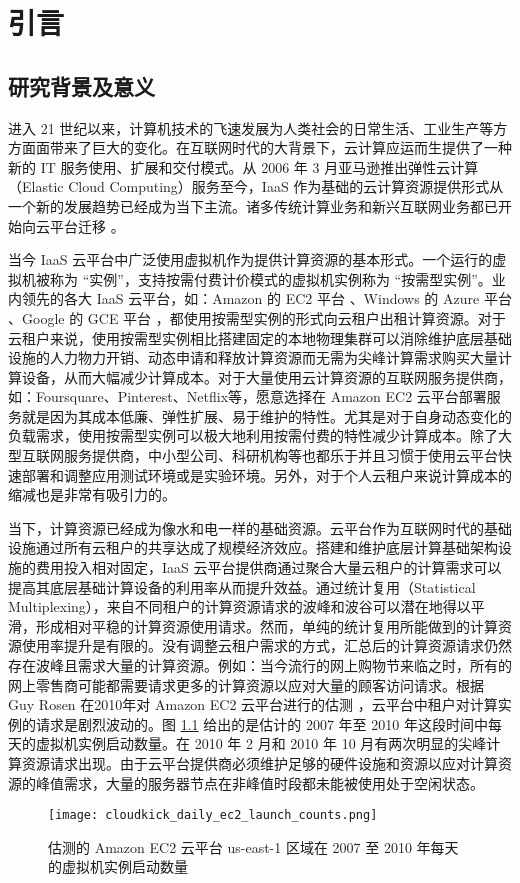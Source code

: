 \chapter{引言}
\label{cha:intro}

\section{研究背景及意义}
进入 21 世纪以来，计算机技术的飞速发展为人类社会的日常生活、工业生产等方方面面带来了巨大的变化。在互联网时代的大背景下，云计算应运而生提供了一种新的 IT 服务使用、扩展和交付模式。从 2006 年 3 月亚马逊推出弹性云计算（Elastic Cloud Computing）服务至今，IaaS 作为基础的云计算资源提供形式从一个新的发展趋势已经成为当下主流。诸多传统计算业务和新兴互联网业务都已开始向云平台迁移 \cite{Armbrust:2010:VCC:1721654.1721672}。

当今 IaaS 云平台中广泛使用虚拟机作为提供计算资源的基本形式。一个运行的虚拟机被称为 ``实例''，支持按需付费计价模式的虚拟机实例称为 ``按需型实例''。业内领先的各大 IaaS 云平台，如：Amazon 的 EC2 平台 \cite{AWS}、Windows 的 Azure 平台 \cite{Azure}、Google 的 GCE 平台 \cite{GCE}，都使用按需型实例的形式向云租户出租计算资源。对于云租户来说，使用按需型实例相比搭建固定的本地物理集群可以消除维护底层基础设施的人力物力开销、动态申请和释放计算资源而无需为尖峰计算需求购买大量计算设备，从而大幅减少计算成本。对于大量使用云计算资源的互联网服务提供商，如：Foursquare、Pinterest、Netflix等，愿意选择在 Amazon EC2 云平台部署服务就是因为其成本低廉、弹性扩展、易于维护的特性。尤其是对于自身动态变化的负载需求，使用按需型实例可以极大地利用按需付费的特性减少计算成本。除了大型互联网服务提供商，中小型公司、科研机构等也都乐于并且习惯于使用云平台快速部署和调整应用测试环境或是实验环境。另外，对于个人云租户来说计算成本的缩减也是非常有吸引力的。

当下，计算资源已经成为像水和电一样的基础资源。云平台作为互联网时代的基础设施通过所有云租户的共享达成了规模经济效应。搭建和维护底层计算基础架构设施的费用投入相对固定，IaaS 云平台提供商通过聚合大量云租户的计算需求可以提高其底层基础计算设备的利用率从而提升效益。通过统计复用（Statistical Multiplexing），来自不同租户的计算资源请求的波峰和波谷可以潜在地得以平滑，形成相对平稳的计算资源使用请求。然而，单纯的统计复用所能做到的计算资源使用率提升是有限的。没有调整云租户需求的方式，汇总后的计算资源请求仍然存在波峰且需求大量的计算资源。例如：当今流行的网上购物节来临之时，所有的网上零售商可能都需要请求更多的计算资源以应对大量的顾客访问请求。根据 Guy Rosen 在2010年对 Amazon EC2 云平台进行的估测 \cite{ec2dailyusage}，云平台中租户对计算实例的请求是剧烈波动的。图 \ref{figure:daily_ec2_launch_counts} 给出的是估计的 2007 年至 2010 年这段时间中每天的虚拟机实例启动数量。在 2010 年 2 月和 2010 年 10 月有两次明显的尖峰计算资源请求出现。由于云平台提供商必须维护足够的硬件设施和资源以应对计算资源的峰值需求，大量的服务器节点在非峰值时段都未能被使用处于空闲状态。
\begin{figure}
  \centering
  \texttt{[image: cloudkick\_daily\_ec2\_launch\_counts.png]}
  \caption{估测的 Amazon EC2 云平台 us-east-1 区域在 2007 至 2010 年每天的虚拟机实例启动数量 \cite{ec2dailyusage}}
  \label{figure:daily_ec2_launch_counts}
\end{figure}

